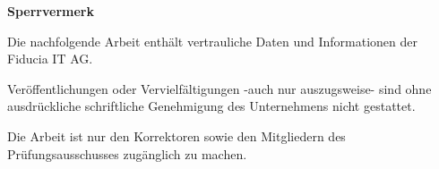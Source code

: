\thispagestyle{empty}
\begin{center}
\Large\bfseries Sperrvermerk
\end{center}
Die nachfolgende Arbeit enthält vertrauliche Daten und Informationen der Fiducia IT AG.

\medskip 
\noindent 
Veröffentlichungen oder Vervielfältigungen -auch nur auszugsweise- sind ohne ausdrückliche schriftliche Genehmigung des Unternehmens nicht gestattet.

\noindent Die Arbeit ist nur den Korrektoren sowie den Mitgliedern des Prüfungsausschusses zugänglich zu machen.


